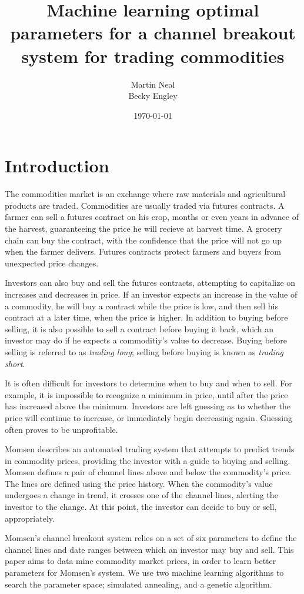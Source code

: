 \documentclass[10pt]{article}
\title{Machine learning optimal parameters for a channel breakout system for trading
commodities}
\author{Martin Neal\\
  Becky Engley}
\date{\today}
\begin{document}
\maketitle

\section{Introduction}

The commodities market is an exchange where raw materials and agricultural
products are traded. Commodities are usually traded via futures contracts. A
farmer can sell a futures contract on his crop, months or even years in advance
of the harvest, guaranteeing the price he will recieve at harvest time. A
grocery chain can buy the contract, with the confidence that the price will not
go up when the farmer delivers. Futures contracts protect farmers and buyers
from unexpected price changes.

Investors can also buy and sell the futures contracts, attempting to capitalize
on increases and decreases in price. If an investor expects an increase in the
value of a commodity, he will buy a contract while the price is low, and then
sell his contract at a later time, when the price is higher. In addition to
buying before selling, it is also possible to sell a contract before buying it
back, which an investor may do if he expects a commoditiy's value to decrease.
Buying before selling is referred to as \emph{trading long}; selling before
buying is known as \emph{trading short}.

It is often difficult for investors to determine when to buy and when to sell.
For example, it is impossible to recognize a minimum in price, until after the
price has increased above the minimum. Investors are left guessing as to
whether the price will continue to increase, or immediately begin decreasing
again. Guessing often proves to be unprofitable.

Momsen describes an automated trading system that attempts to predict trends in
commodity prices, providing the investor with a guide to buying and selling.
Momsen defines a pair of channel lines above and below the commodity's price.
The lines are defined using the price history. When the commodity's value
undergoes a change in trend, it crosses one of the channel lines, alerting the
investor to the change. At this point, the investor can decide to buy or
sell, appropriately.

Momsen's channel breakout system relies on a set of six parameters to define
the channel lines and date ranges between which an investor may buy and sell.
This paper aims to data mine commodity market prices, in order to learn better
parameters for Momsen's system. We use two machine learning algorithms to
search the parameter space; simulated annealing, and a genetic algorithm.
\end{document}
